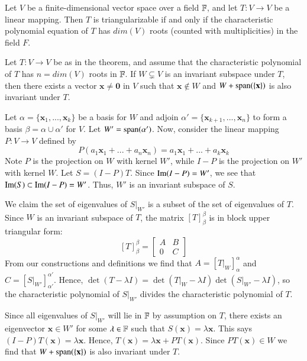 \documentclass[12pt]{report}
\newcommand{\mb}[1]{\mathbf{#1}}
\begin{document}
\begin{thm}{}{}
    Let $V$ be a finite-dimensional vector space over a field $\mathbb F$, and let $T:V\rightarrow V$ be a linear mapping. Then $T$ is triangularizable if and only if the characteristic polynomial equation of $T$ has $dim(V)$ roots (counted with multiplicities) in the field $F$.
\end{thm}

\begin{lem}{}{}
    Let $T:V\rightarrow V$ be as in the theorem, and assume that the characteristic polynomial of $T$ has $n = dim(V)$ roots in $\mathbb F$. If $W \subsetneq V$ is an invariant subspace under $T$, then there exists a vector $\mb x \neq \mb 0$ in $V$ such that $\mb x \notin W$ and $W + \spn(\{\mb x\})$ is also invariant under $T$.
\end{lem}
\begin{proof*}{}{}
    Let $\alpha = \{\mb x_1,...,\mb x_k\}$ be a basis for $W$ and adjoin $\alpha' = \{\mb x_{k+1},...,\mb x_n\}$ to form a basis $\beta = \alpha \cup \alpha'$ for $V$. Let $W' = \operatorname{span}(\alpha')$. Now, consider the linear mapping $P:V \rightarrow V$ defined by $$P(a_1\mb x_1 + ... + a_n\mb x_n) = a_1 \mb x_1 + ... + a_k\mb x_k$$
    Note $P$ is the projection on $W$ with kernel $W'$, while $I - P$ is the projection on $W'$ with kernel $W$. Let $S = (I - P)T$. Since $\operatorname{Im}(I - P) = W'$, we see that $\operatorname{Im}(S) \subset \operatorname{Im}(I - P) = W'$. Thus, $W'$ is an invariant subspace of $S$. 
    
    We claim the set of eigenvalues of $S\rvert_{W'}$ is a subset of the set of eigenvalues of $T$. Since $W$ is an invariant subspace of $T$, the matrix $[T]_{\beta}^{\beta}$ is in block upper triangular form: $$[T]_{\beta}^{\beta} = \begin{bmatrix} A & B \\ 0 & C \end{bmatrix}$$ From our constructions and definitions we find that $A = [T\rvert_W]_{\alpha}^{\alpha}$ and $C = [S\rvert_{W'}]_{\alpha'}^{\alpha'}$. Hence, $\det(T-\lambda I) = \det(T\rvert_W - \lambda I)\det(S\rvert_{W'} - \lambda I)$, so the characteristic polynomial of $S\rvert_{W'}$ divides the characteristic polynomial of $T$.
    
    
    Since all eigenvalues of $S\rvert_{W'}$ will lie in $\mathbb F$ by assumption on $T$, there exists an eigenvector $\mb x \in W'$ for some $\lambda \in \mathbb F$ such that $S(\mb x) = \lambda \mb x$. This says $(I-P)T(\mb x) = \lambda\mb x$. Hence, $T(\mb x) = \lambda\mb x + PT(\mb x)$. Since $PT(\mb x) \in W$ we find that $W + \spn(\{\mb x\})$ is also invariant under $T$.
\end{proof*}
\end{document}
